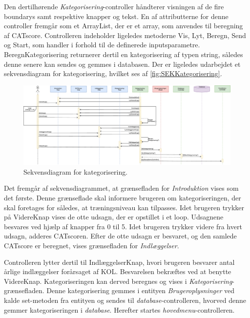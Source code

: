Den dertilhørende \textit{Kategorisering}-controller håndterer visningen af de fire boundarys samt respektive knapper og tekst. En af attributterne for denne controller fremgår som et ArrayList, der er et array, som anvendes til beregning af CATscore. Controlleren indeholder ligeledes metoderne Vis, Lyt, Beregn, Send og Start, som handler i forhold til de definerede inputsparametre. BeregnKategorisering returnerer dertil en kategorisering af typen string, således denne senere kan sendes og gemmes i databasen. Der er ligeledes udarbejdet et sekvensdiagram for kategorisering, hvilket ses af \autoref{fig:SEKKategorisering}.

\begin{figure} [H]
\centering
\includegraphics[width=1.55\textwidth, angle=90]{figures/Sek/SEKKategorisering}
\caption{Sekvensdiagram for kategorisering.}
\label{fig:SEKKategorisering}
\end{figure}

\noindent
Det fremgår af sekvensdiagrammet, at grænsefladen for \textit{Introduktion} vises som det første. Denne grænseflade skal informere brugeren om kategoriseringen, der skal foretages for således, at træningsniveau kan tilpasses. Idet brugeren trykker på VidereKnap vises de otte udsagn, der er opstillet i et loop. Udsagnene besvares ved hjælp af knapper fra 0 til 5. Idet brugeren trykker videre fra hvert udsagn, adderes CATscoren. Efter de otte udsagn er besvaret, og den samlede CATscore er beregnet, vises grænsefladen for \textit{Indlæggelser}. 


Controlleren lytter dertil til IndlæggelserKnap, hvori brugeren besvarer antal årlige indlæggelser forårsaget af KOL. Besvarelsen bekræftes ved at benytte VidereKnap. Kategoriseringen kan derved beregnes og vises i \textit{Kategorisering}-grænsefladen. Denne kategorisering gemmes i entityen \textit{Brugeroplysninger} ved kalde set-metoden fra entityen og sendes til \textit{database}-controlleren, hvorved denne gemmer kategoriseringen i \textit{database}. Herefter startes \textit{hovedmenu}-controlleren. 
